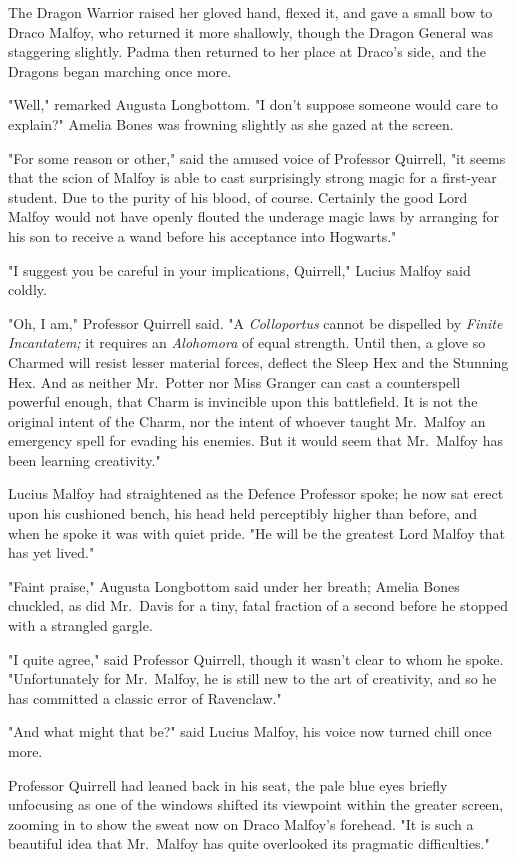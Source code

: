 The Dragon Warrior raised her gloved hand, flexed it, and gave a small bow to
Draco Malfoy, who returned it more shallowly, though the Dragon General was
staggering slightly. Padma then returned to her place at Draco's side, and the
Dragons began marching once more.

"Well," remarked Augusta Longbottom. "I don't suppose someone would care to
explain?" Amelia Bones was frowning slightly as she gazed at the screen.

"For some reason or other," said the amused voice of Professor Quirrell, "it
seems that the scion of Malfoy is able to cast surprisingly strong magic for a
first-year student. Due to the purity of his blood, of course. Certainly the
good Lord Malfoy would not have openly flouted the underage magic laws by
arranging for his son to receive a wand before his acceptance into Hogwarts."

"I suggest you be careful in your implications, Quirrell," Lucius Malfoy said
coldly.

"Oh, I am," Professor Quirrell said. "A \emph{Colloportus} cannot be dispelled
by \emph{Finite Incantatem;} it requires an \emph{Alohomora} of equal strength.
Until then, a glove so Charmed will resist lesser material forces, deflect the
Sleep Hex and the Stunning Hex. And as neither Mr.~Potter nor Miss Granger can
cast a counterspell powerful enough, that Charm is invincible upon this
battlefield. It is not the original intent of the Charm, nor the intent of
whoever taught Mr.~Malfoy an emergency spell for evading his enemies. But it
would seem that Mr.~Malfoy has been learning creativity."

Lucius Malfoy had straightened as the Defence Professor spoke; he now sat erect
upon his cushioned bench, his head held perceptibly higher than before, and
when he spoke it was with quiet pride. "He will be the greatest Lord Malfoy
that has yet lived."

"Faint praise," Augusta Longbottom said under her breath; Amelia Bones
chuckled, as did Mr.~Davis for a tiny, fatal fraction of a second before he
stopped with a strangled gargle.

"I quite agree," said Professor Quirrell, though it wasn't clear to whom he
spoke. "Unfortunately for Mr.~Malfoy, he is still new to the art of creativity,
and so he has committed a classic error of Ravenclaw."

"And what might that be?" said Lucius Malfoy, his voice now turned chill once
more.

Professor Quirrell had leaned back in his seat, the pale blue eyes briefly
unfocusing as one of the windows shifted its viewpoint within the greater
screen, zooming in to show the sweat now on Draco Malfoy's forehead. "It is
such a beautiful idea that Mr.~Malfoy has quite overlooked its pragmatic
difficulties."

